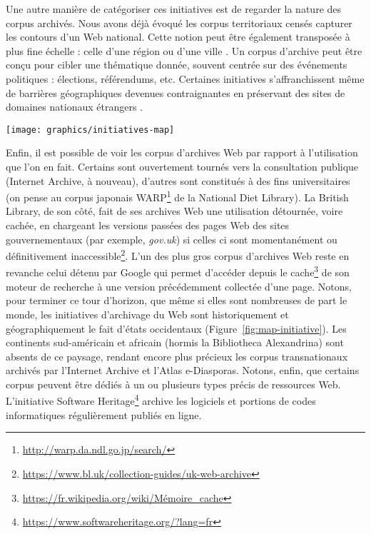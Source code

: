 \documentclass[symmetric,justified,marginals=raggedouter]{tufte-book}
\begin{document}
Une autre manière de catégoriser ces initiatives est de regarder la nature des corpus archivés. Nous avons déjà évoqué les corpus territoriaux censés capturer les contours d'un Web national. Cette notion peut être également transposée à plus fine échelle : celle d'une région ou d'une ville \citep{boudrez_archiving_2002}. Un corpus d'archive peut être conçu pour cibler une thématique donnée, souvent  centrée sur des événements politiques \citep{voerman_archiving_2002,schneider_building_2003} : élections, référendums, etc. Certaines initiatives s'affranchissent même de barrières géographiques devenues contraignantes en préservant des sites de domaines nationaux étrangers \citep{gomes_introducing_2009}.

\begin{figure*}%
  \texttt{[image: graphics/initiatives-map]}
  \caption{Carte des initiatives d'archivage du Web par pays et années de création (sources : \citep{gomes_survey_2011} \& \url{https://en.wikipedia.org/wiki/List_of_Web_archiving_initiatives})}
  \label{fig:map-initiative}
\end{figure*} 

\noindent Enfin, il est possible de voir les corpus d'archives Web par rapport à l'utilisation que l'on en fait. Certains sont ouvertement tournés vers la consultation publique (Internet Archive, à nouveau), d'autres sont constitués à des fins universitaires (on pense au corpus japonais WARP\footnote{\RaggedOuter \url{http://warp.da.ndl.go.jp/search/}} de la National Diet Library). La British Library, de son côté, fait de ses archives Web une utilisation détournée, voire cachée, en chargeant les versions passées des pages Web des sites gouvernementaux (par exemple, \textit{gov.uk}) si celles ci sont momentanément ou définitivement inaccessible\footnote{\RaggedOuter \url{https://www.bl.uk/collection-guides/uk-web-archive}}. L'un des plus gros corpus d'archives Web reste en revanche celui détenu par Google qui permet d'accéder depuis le cache\footnote{\RaggedOuter \url{https://fr.wikipedia.org/wiki/Mémoire_cache}} de son moteur de recherche à une version précédemment collectée d'une page. Notons, pour terminer ce tour d'horizon, que même si elles sont nombreuses de part le monde, les initiatives d'archivage du Web sont historiquement et géographiquement le fait d'états occidentaux (Figure~\ref{fig:map-initiative}). Les continents sud-américain et africain (hormis la Bibliotheca Alexandrina) sont absents de ce paysage, rendant encore plus précieux les corpus transnationaux archivés par l'Internet Archive et l'Atlas e-Diasporas. Notons, enfin, que certains corpus peuvent être dédiés à un ou plusieurs types précis de ressources Web. L'initiative Software Heritage\footnote{\RaggedOuter \url{https://www.softwareheritage.org/?lang=fr}} archive les logiciels et portions de codes informatiques régulièrement publiés en ligne. 
\end{document}
